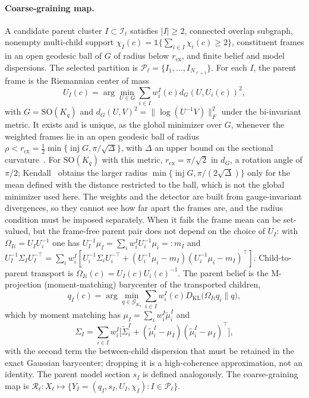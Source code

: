 \paragraph{Coarse-graining map.}
A candidate parent cluster $I \subset \mathcal{I}_\ell$ satisfies $|I| \ge 2$, connected overlap subgraph, nonempty multi-child support $\chi_I(c) = \mathbb{1}\{\sum_{i \in I}\chi_i(c) \ge 2\}$, constituent frames in an open geodesic ball of $G$ of radius below $r_{\mathrm{cx}}$, and finite belief and model dispersions. The selected partition is $\mathcal{P}_\ell = \{I_1, \ldots, I_{N_{\ell+1}}\}$. For each $I$, the parent frame is the Riemannian center of mass
\begin{equation}
U_I(c) = \arg\min_{U \in G} \sum_{i \in I} w_i^I(c) d_G(U, U_i(c))^2,
\end{equation}
with $G = \mathrm{SO}(K_q)$ and $d_G(U, V)^2 = \|\log(U^{-1}V)\|_F^2$ under the bi-invariant metric. It exists and is unique, as the global minimizer over $G$, whenever the weighted frames lie in an open geodesic ball of radius $\rho<r_{\mathrm{cx}}=\tfrac12\min\{\operatorname{inj}G,\pi/\sqrt{\Delta}\}$, with $\Delta$ an upper bound on the sectional curvature~\cite[Thm.~2.1]{Afsari2011}. For $\mathrm{SO}(K_q)$ with this metric, $r_{\mathrm{cx}}=\pi/\sqrt2$ in $d_G$, a rotation angle of $\pi/2$; Kendall~\cite{Kendall1990} obtains the larger radius $\min\{\operatorname{inj}G,\pi/(2\sqrt{\Delta})\}$ only for the mean defined with the distance restricted to the ball, which is not the global minimizer used here. The weights and the detector are built from gauge-invariant divergences, so they cannot see how far apart the frames are, and the radius condition must be imposed separately. When it fails the frame mean can be set-valued, but the frame-free parent pair does not depend on the choice of $U_I$: with $\Omega_{Ii}=U_IU_i^{-1}$ one has $U_I^{-1}\mu_I=\sum_iw_i^IU_i^{-1}\mu_i=:m_I$ and $U_I^{-1}\Sigma_IU_I^{-\top}=\sum_iw_i^I[U_i^{-1}\Sigma_iU_i^{-\top}+(U_i^{-1}\mu_i-m_I)(U_i^{-1}\mu_i-m_I)^\top]$. Child-to-parent transport is $\Omega_{Ii}(c) = U_I(c)U_i(c)^{-1}$. The parent belief is the M-projection (moment-matching) barycenter of the transported children,
\begin{equation}
q_I(c) = \arg\min_{q \in \mathcal{G}_{K_q}} \sum_{i \in I} w_i^I(c) D_{\mathrm{KL}}\big(\Omega_{Ii}q_i \| q\big),
\end{equation}
which by moment matching has $\mu_I = \sum_i w_i^I \widetilde{\mu}_i^I$ and
\begin{equation}
\Sigma_I = \sum_{i \in I} w_i^I\big[\widetilde{\Sigma}_i^I + (\widetilde{\mu}_i^I - \mu_I)(\widetilde{\mu}_i^I - \mu_I)^\top\big],
\end{equation}
with the second term the between-child dispersion that must be retained in the exact Gaussian barycenter; dropping it is a high-coherence approximation, not an identity. The parent model section $s_I$ is defined analogously. The coarse-graining map is $\mathcal{R}_\ell : X_\ell \mapsto \{Y_I = (q_I, s_I, U_I, \chi_I) : I \in \mathcal{P}_\ell\}$.


